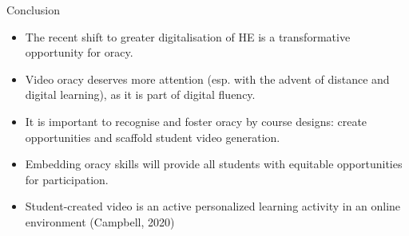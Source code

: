 \documentclass[final]{beamer}
\newlength{\onecolwid}
\begin{document}
\begin{frame}[t]
\begin{columns}[t]
\begin{column}{\onecolwid}


\begin{alertblock}{Conclusion}

\begin{itemize}
\item The recent shift to greater digitalisation of HE is a transformative opportunity for oracy.
\item Video oracy deserves more attention (esp. with the advent of distance and digital learning), as it is part of digital fluency.
\item It is important to recognise and foster oracy by course designs: create opportunities and scaffold student video generation.
\item Embedding oracy skills will provide all students with equitable opportunities for participation.
\item Student-created video is an active personalized learning activity in an online environment (Campbell, 2020)
\end{itemize}


\end{alertblock}



\end{column}
\end{columns}
\end{frame}
\end{document}
